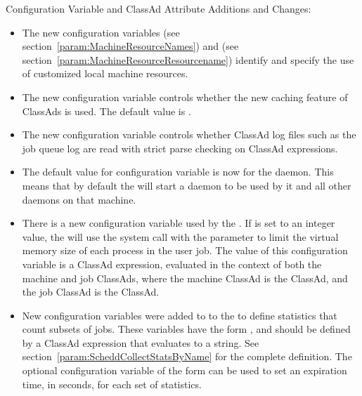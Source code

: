 \noindent Configuration Variable and ClassAd Attribute Additions and Changes:

\begin{itemize}

\item The new configuration variables 
(see section~\ref{param:MachineResourceNames})
and 
(see section~\ref{param:MachineResourceResourcename})
identify and specify the use of customized local machine resources.

\item The new configuration variable 
controls whether the new caching feature of ClassAds is used.
The default value is .

\item The new configuration variable 
controls whether ClassAd log files such as the job queue
log are read with strict parse checking on ClassAd expressions.

\item The default value for configuration variable 
is now  for the  daemon.  
This means that by
default the  will start a  daemon to be used 
by it and all other daemons on that machine.

\item There is a new configuration variable used by the .
If  is set to an integer value, 
the 
will use the  system call with the 
 parameter to
limit the virtual memory size of each process in the user job.  
The value of this configuration variable is a ClassAd expression, 
evaluated in the context of both the machine and job ClassAds, 
where the machine ClassAd is the  ClassAd, 
and the job ClassAd is the  ClassAd.

\item New configuration variables were added to to the  to
define statistics that count subsets of jobs. 
These variables have the form ,
and should be defined by a ClassAd expression that evaluates to a string.
See section~\ref{param:ScheddCollectStatsByName}
for the complete definition.
The optional configuration variable of the form
 can be used to set an expiration time,
in seconds, for each set of statistics.


\end{itemize}
